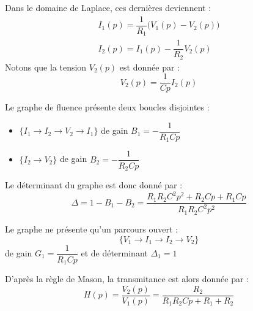 Dans le domaine de Laplace, ces dernières deviennent :
\begin{align*}
    I_1(p)=\dfrac{1}{R_1}\big(V_1(p)-V_2(p)\big)\\
    I_2(p)=I_1(p)-\dfrac{1}{R_2}V_2(p)
\end{align*}
Notons que la tension $V_2(p)$ est donnée par :
\[
    V_2(p)=\dfrac{1}{Cp}I_2(p)
\]
\begin{center}
    
\end{center}
Le graphe de fluence présente deux boucles disjointes :
\begin{itemize}
    \item $\{I_1\rightarrow I_2\rightarrow V_2\rightarrow I_1\}$ 
          de gain $B_1=-\dfrac{1}{R_1Cp}$ 
    \item $\{I_2\rightarrow V_2\}$ de gain $B_2=-\dfrac{1}{R_2Cp}$ 
\end{itemize}
Le déterminant du graphe est donc donné par :
\[
    \Delta=1-B_1-B_2=\dfrac{R_1R_2C^2p^2+R_2Cp+R_1Cp}{R_1R_2C^2p^2}
\]

Le graphe ne présente qu'un parcours ouvert :
\[
    \{V_1\rightarrow I_1\rightarrow I_2\rightarrow V_2\}
\]
de gain $G_1=\dfrac{1}{R_1Cp}$ et de déterminant $\Delta_1=1$

D'après la règle de Mason, la transmitance est alors donnée par :
\[
    H(p)=\dfrac{V_2(p)}{V_1(p)}=\dfrac{R_2}{R_1R_2Cp+ R_1+R_2}
\]
